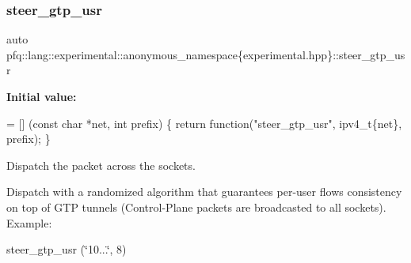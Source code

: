 \subsubsection{\texorpdfstring{steer\+\_\+gtp\+\_\+usr}{steer\_gtp\_usr}}
{\footnotesize\ttfamily auto pfq\+::lang\+::experimental\+::anonymous\+\_\+namespace\{experimental.\+hpp\}\+::steer\+\_\+gtp\+\_\+usr}

{\bfseries Initial value\+:}
\begin{DoxyCode}
= [] (\textcolor{keyword}{const} \textcolor{keywordtype}{char} *net, \textcolor{keywordtype}{int} prefix)
        \{
            \textcolor{keywordflow}{return} \textcolor{keyword}{function}(\textcolor{stringliteral}{"steer\_gtp\_usr"}, ipv4\_t\{net\}, prefix);
        \}
\end{DoxyCode}


Dispatch the packet across the sockets. 

Dispatch with a randomized algorithm that guarantees per-\/user flows consistency on top of G\+TP tunnels (Control-\/\+Plane packets are broadcasted to all sockets). Example\+:

steer\+\_\+gtp\+\_\+usr (\char`\"{}10...\char`\"{}, 8) 